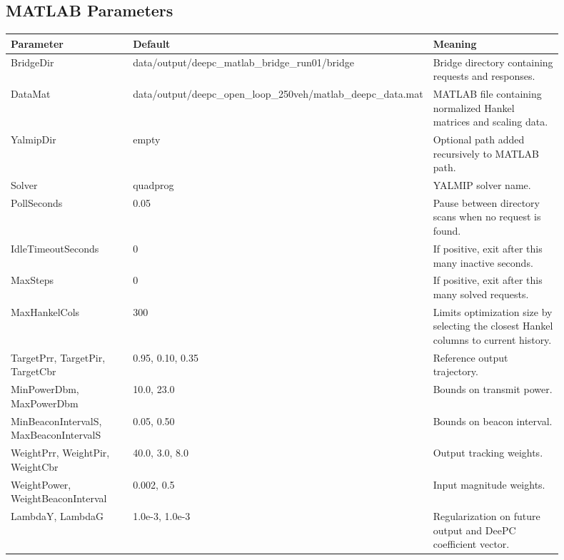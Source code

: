 \documentclass[11pt]{article}
\DeclareRobustCommand{\code}[1]{\texttt{\detokenize{#1}}}
\def\code#1{#1}%
\begin{document}
\subsection{MATLAB Parameters}

\begin{center}
\begin{longtable}{L{0.28\linewidth}L{0.18\linewidth}L{0.44\linewidth}}
\toprule
Parameter & Default & Meaning \\
\midrule
\endhead
\code{BridgeDir} &
\code{data/output/deepc_matlab_bridge_run01/bridge} &
Bridge directory containing \code{requests} and \code{responses}. \\
\code{DataMat} &
\code{data/output/deepc_open_loop_250veh/matlab_deepc_data.mat} &
MATLAB file containing normalized Hankel matrices and scaling data. \\
\code{YalmipDir} &
empty &
Optional path added recursively to MATLAB path. \\
\code{Solver} &
\code{quadprog} &
YALMIP solver name. \\
\code{PollSeconds} &
\code{0.05} &
Pause between directory scans when no request is found. \\
\code{IdleTimeoutSeconds} &
\code{0} &
If positive, exit after this many inactive seconds. \\
\code{MaxSteps} &
\code{0} &
If positive, exit after this many solved requests. \\
\code{MaxHankelCols} &
\code{300} &
Limits optimization size by selecting the closest Hankel columns to current
history. \\
\code{TargetPrr}, \code{TargetPir}, \code{TargetCbr} &
\code{0.95}, \code{0.10}, \code{0.35} &
Reference output trajectory. \\
\code{MinPowerDbm}, \code{MaxPowerDbm} &
\code{10.0}, \code{23.0} &
Bounds on transmit power. \\
\code{MinBeaconIntervalS}, \code{MaxBeaconIntervalS} &
\code{0.05}, \code{0.50} &
Bounds on beacon interval. \\
\code{WeightPrr}, \code{WeightPir}, \code{WeightCbr} &
\code{40.0}, \code{3.0}, \code{8.0} &
Output tracking weights. \\
\code{WeightPower}, \code{WeightBeaconInterval} &
\code{0.002}, \code{0.5} &
Input magnitude weights. \\
\code{LambdaY}, \code{LambdaG} &
\code{1.0e-3}, \code{1.0e-3} &
Regularization on future output and DeePC coefficient vector. \\
\bottomrule
\end{longtable}
\end{center}
\end{document}
